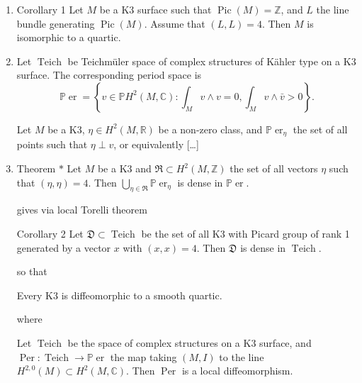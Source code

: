 \begin{enumerate}[label=\textbf{Step \arabic*}]
\item 
	\begin{thing4}{Corollary 1}\leavevmode
		Let $M$ be a K3 surface such that $ \operatorname{Pic}(M)=\mathbb{Z}$, and $L$ the line bundle generating $ \operatorname{Pic}(M)$. Assume that $(L,L)=4$. Then  $M$ is isomorphic to a quartic.
	\end{thing4}

	\item 
		\begin{defn}[Period]\leavevmode
			Let $\operatorname{Teich}$ be Teichmüler space of complex structures of Kähler type on a K3 surface. The corresponding period space is \[\mathbb{P}\operatorname{er}=\left\{v\in\mathbb{P}H^{2}(M,\mathbb{C}):\int_{M}v\wedge v=0, \int_{M}v\wedge \bar{v}>0\right\}.\]
		\end{defn}

		\begin{defn}\leavevmode
			Let $M$ be a K3, $\eta\in H^{2}(M,\mathbb{R})$ be a non-zero class, and $\mathbb{P}\operatorname{er}_\eta$ the set of all points such that $\eta\perp v$, or equivalently […]
		\end{defn}
	\item 
		\begin{thing8}{Theorem $*$}\leavevmode
			Let $M$ be a K3 and $\mathfrak{R}\subset H^{2}(M,\mathbb{Z})$ the set of all vectors $\eta$ such that $(\eta,\eta)=4$. Then $\bigcup_{\eta\in\mathfrak{R}} \mathbb{P}\operatorname{er}_\eta$ is dense in $\mathbb{P}\operatorname{er}$.
		\end{thing8}
gives via local Torelli theorem
\begin{thing7}{Corollary 2}\leavevmode
	Let $\mathfrak{D}\subset \operatorname{Teich}$ be the set of all K3 with Picard group of rank 1 generated by a vector $x$ with $(x,x)=4$. Then  $\mathfrak{D}$ is dense in $\operatorname{Teich}$.
\end{thing7}
so that
\begin{coro}\leavevmode
	Every K3 is diffeomorphic to a smooth quartic.
\end{coro}
where
\begin{prop}\leavevmode
	Let $\operatorname{Teich}$ be the space of complex structures on a K3 surface, and $\operatorname{Per}:\operatorname{Teich}\to \mathbb{P}\operatorname{er}$ the map taking $(M,I)$ to the line $H^{2,0}(M)\subset H^{2}(M,\mathbb{C})$. Then $\operatorname{P er}$ is a local diffeomorphism.
\end{prop}


\end{enumerate}
